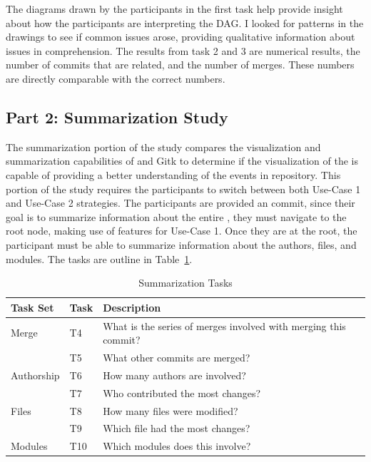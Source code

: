 The diagrams drawn by the participants in the first task help provide
insight about how the participants are interpreting the DAG. I looked
for patterns in the drawings to see if common issues arose, providing
qualitative information about issues in comprehension. The results from
task 2 and 3 are numerical results, the number of commits that are
related, and the number of merges. These numbers are directly comparable
with the correct numbers.

\subsection{Part 2: Summarization Study}\label{sub:summarization_study}

The summarization portion of the study compares the visualization and
summarization capabilities of \tool{} and Gitk to determine if the
visualization of the \mt{} is capable of providing a better
understanding of the events in repository. This portion of the study
requires the participants to switch between both Use-Case 1 and Use-Case
2 strategies. The participants are provided an commit, since their goal
is to summarize information about the entire \mt{}, they must navigate
to the root node, making use of features for Use-Case 1. Once they are
at the root, the participant must be able to summarize information about
the authors, files, and modules. The tasks are outline in
Table~\ref{tab:summarization_tasks}.

\begin{table}[htpb]
  \centering
  \caption{Summarization Tasks}
  \label{tab:summarization_tasks}
  \begin{tabular}{lll}
    \toprule
    Task Set   & Task & Description\\\midrule
    Merge      & T4   & What is the series of merges involved with merging this
    commit?\\
               & T5   & What other commits are merged?\\
    Authorship & T6   & How many authors are involved?\\
               & T7   & Who contributed the most changes?\\
    Files      & T8   & How many files were modified?\\
               & T9   & Which file had the most changes?\\
    Modules    & T10  & Which modules does this \mt{} involve?\\
    \bottomrule
  \end{tabular}
\end{table}

